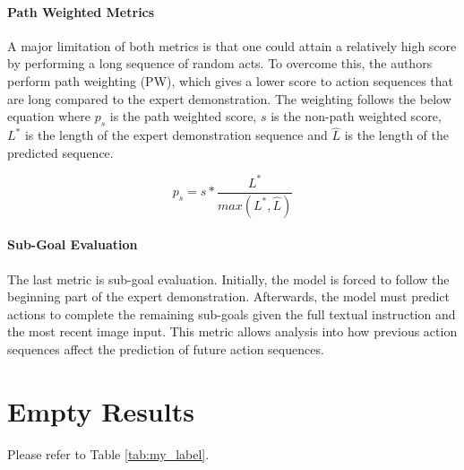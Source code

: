 \documentclass[11pt,a4paper]{article}
\begin{document}
\paragraph{Path Weighted Metrics} A major limitation of both metrics is that one could attain a relatively high score by performing a long sequence of random acts. To overcome this, the authors perform path weighting (PW), which gives a lower score to action sequences that are long compared to the expert demonstration. The weighting follows the below equation where $p_s$ is the path weighted score, $s$ is the non-path weighted score, $L^*$ is the length of the expert demonstration sequence and $\hat{L}$ is the length of the predicted sequence.

$$p_s = s * \frac{L^{*}}{max(L^{*}, \hat{L} )}$$

\paragraph{Sub-Goal Evaluation} The last metric is sub-goal evaluation. Initially, the model is forced to follow the beginning part of the expert demonstration. Afterwards, the model must predict actions to complete the remaining sub-goals given the full textual instruction and the most recent image input. This metric allows analysis into how previous action sequences affect the prediction of future action sequences.


\section{Empty Results}
Please refer to Table \ref{tab:my_label}.

\clearpage



\end{document}
